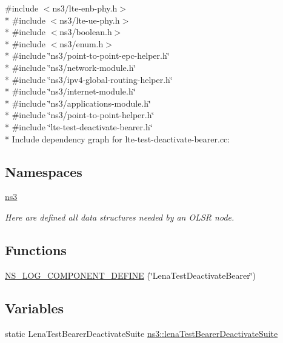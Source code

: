 {\ttfamily \#include $<$ns3/lte-\/enb-\/phy.\+h$>$}\\*
{\ttfamily \#include $<$ns3/lte-\/ue-\/phy.\+h$>$}\\*
{\ttfamily \#include $<$ns3/boolean.\+h$>$}\\*
{\ttfamily \#include $<$ns3/enum.\+h$>$}\\*
{\ttfamily \#include \char`\"{}ns3/point-\/to-\/point-\/epc-\/helper.\+h\char`\"{}}\\*
{\ttfamily \#include \char`\"{}ns3/network-\/module.\+h\char`\"{}}\\*
{\ttfamily \#include \char`\"{}ns3/ipv4-\/global-\/routing-\/helper.\+h\char`\"{}}\\*
{\ttfamily \#include \char`\"{}ns3/internet-\/module.\+h\char`\"{}}\\*
{\ttfamily \#include \char`\"{}ns3/applications-\/module.\+h\char`\"{}}\\*
{\ttfamily \#include \char`\"{}ns3/point-\/to-\/point-\/helper.\+h\char`\"{}}\\*
{\ttfamily \#include \char`\"{}lte-\/test-\/deactivate-\/bearer.\+h\char`\"{}}\\*
Include dependency graph for lte-\/test-\/deactivate-\/bearer.cc\+:
\subsection*{Namespaces}
\begin{DoxyCompactItemize}
\item 
 \hyperlink{namespacens3}{ns3}
\begin{DoxyCompactList}\small\item\em Here are defined all data structures needed by an O\+L\+SR node. \end{DoxyCompactList}\end{DoxyCompactItemize}
\subsection*{Functions}
\begin{DoxyCompactItemize}
\item 
\hyperlink{lte-test-deactivate-bearer_8cc_afed5e1e46da8eead335b695db91db638}{N\+S\+\_\+\+L\+O\+G\+\_\+\+C\+O\+M\+P\+O\+N\+E\+N\+T\+\_\+\+D\+E\+F\+I\+NE} (\char`\"{}Lena\+Test\+Deactivate\+Bearer\char`\"{})
\end{DoxyCompactItemize}
\subsection*{Variables}
\begin{DoxyCompactItemize}
\item 
static Lena\+Test\+Bearer\+Deactivate\+Suite \hyperlink{namespacens3_a0e33f3a2e9b435494c422f6e4b7bb54d}{ns3\+::lena\+Test\+Bearer\+Deactivate\+Suite}
\end{DoxyCompactItemize}


